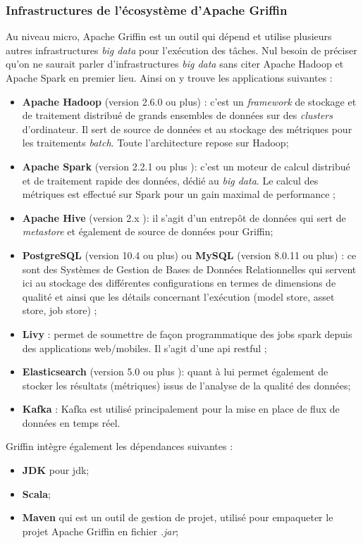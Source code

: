 \subsubsection{\textbf{Infrastructures de l'écosystème d'Apache Griffin}}
Au niveau micro, Apache Griffin est un outil qui d\'epend et utilise plusieurs autres infrastructures \textit{big data} pour l'ex\'ecution des t\^aches. Nul besoin de pr\'eciser qu'on ne saurait parler d'infrastructures \textit{big data} sans citer Apache Hadoop et Apache Spark en premier lieu. Ainsi on y trouve les applications suivantes :

\begin{itemize}[parsep=0cm,itemsep=0cm]
\item \textbf{Apache Hadoop} (version 2.6.0 ou plus) : c'est un \textit{framework} de stockage et de traitement distribu\'e de grands ensembles de donn\'ees sur des \textit{clusters} d'ordinateur. Il sert de source de donn\'ees et au stockage des m\'etriques pour les traitements \textit{batch}. Toute l'architecture repose sur Hadoop;

\item \textbf{Apache Spark }(version 2.2.1 ou plus ): c'est un moteur de calcul distribu\'e et de traitement rapide des donn\'ees, d\'edi\'e au \textit{big data}. Le calcul des m\'etriques est effectu\'e sur Spark pour un gain maximal de performance ;

\item \textbf{Apache Hive} (version 2.x ): il s'agit d'un entrep\^ot de donn\'ees qui sert de \textit{metastore} et \'egalement de source de donn\'ees pour Griffin;

\item \textbf{PostgreSQL} (version 10.4 ou plus) ou \textbf{MySQL} (version 8.0.11 ou plus) :  ce sont des Syst\`emes de Gestion de Bases de Donn\'ees Relationnelles qui servent ici au stockage des diff\'erentes configurations en termes de dimensions de qualit\'e  et ainsi que les d\'etails concernant l'ex\'ecution (model store, asset store, job store) ;

\item \textbf{Livy} : permet de soumettre de façon programmatique des jobs spark  depuis des applications web/mobiles. Il s'agit d'une \acrshort{api} \acrshort{rest}ful ;

\item \textbf{Elasticsearch} (version 5.0 ou plus ): quant \`a lui permet \'egalement de stocker les r\'esultats (m\'etriques) issus de l'analyse de la qualit\'e des donn\'ees;

\item \textbf{Kafka} : Kafka est utilisé principalement pour la mise en place de flux de donn\'ees en temps réel.

\end{itemize}
Griffin int\`egre \'egalement les d\'ependances suivantes : 

\begin{itemize}[parsep=0cm,itemsep=0cm]
\item \textbf{JDK} pour \acrlong{jdk};
\item \textbf{Scala};
\item \textbf{Maven} qui est un outil de  gestion de projet, utilisé pour empaqueter le projet Apache Griffin en fichier \textit{.jar};
\end{itemize}